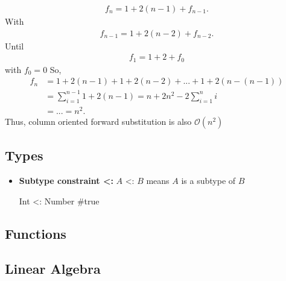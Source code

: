 \documentclass{report}
\begin{document}
\begin{itemize}
            \begin{align*}
                f_{n} = 1 + 2(n-1) + f_{n-1}
            .\end{align*}
            With
            \begin{align*}
                f_{n-1} = 1 + 2(n-2) + f_{n-2}
            .\end{align*}
            Until
            \begin{align*}
                f_{1} = 1 + 2 + f_{0}
            \end{align*}
            with $f_{0} = 0 $
            \bigbreak \noindent 
            So, 
            \begin{align*}
                f_{n} &= 1 + 2(n-1) + 1 + 2(n-2) + ... + 1 + 2(n-(n-1)) \\
                &= \sum_{i=1}^{n-1} 1 + 2(n-1) = n + 2n^{2} - 2\sum_{i=1}^{n}i \\
                &=...=n^{2}
            .\end{align*}
            Thus, column oriented forward substitution is also $\mathcal{O}(n^{2})$


            


            
    \end{itemize}

    \pagebreak 
    \bigbreak \noindent 
    \subsection{Types}
    \bigbreak \noindent 
    \begin{itemize}
        \item \textbf{Subtype constraint <:} $A$ <: $B$ means $A$ is a subtype of $B$
            \bigbreak \noindent 
            \begin{jlcode}
            Int <: Number #true
            \end{jlcode}
    \end{itemize}

    \pagebreak 
    \subsection{Functions}
    \begin{itemize}
        
    \end{itemize}

    \pagebreak 
    \subsection{Linear Algebra}
    \bigbreak \noindent 
\end{document}
